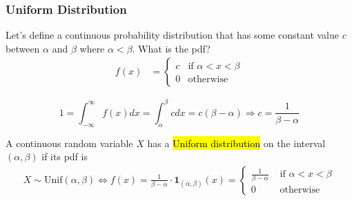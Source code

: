 \documentclass[slidestop,compress,mathserif]{beamer}
\begin{document}
\begin{frame}
\frametitle{Uniform Distribution}

Let's define a continuous probability distribution that has some constant value $c$ between $\alpha$ and $\beta$
where $\alpha < \beta$. What is the pdf?
\begin{align*}
f(x) &= \begin{cases}
c & \text{if $\alpha < x < \beta$} \\
0 & \text{otherwise}
\end{cases}
\end{align*}


\pause
\[1  = \int_{-\infty}^\infty f(x) dx =\int_{\alpha}^\beta c dx
 = c(\beta - \alpha) \Longrightarrow c = \frac{1}{\beta-\alpha} \]

\pause
\begin{defn}
A continuous random variable $X$ has a \hl{Uniform distribution} on the interval $(\alpha, \beta)$ if its pdf is
\vspace{-0.3cm}
\begin{align*}
X \sim \text{Unif}(\alpha, \beta) \Longleftrightarrow
 f(x) = \frac{1}{\beta-\alpha} \cdot \mathbf{1}_{(\alpha, \beta)}(x) =
\begin{cases}
\frac{1}{\beta-\alpha} & \text{ if } \alpha < x < \beta\\
0 & \text{ otherwise}
\end{cases}
\end{align*}
 \end{defn}

\end{frame}

\end{document}
